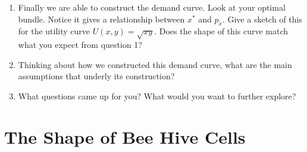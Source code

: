 \documentclass{amsbook}
\begin{document}
\begin{enumerate}
\begin{enumerate}
			\end{enumerate}
		\item Finally we are able to construct the demand curve. Look at your optimal bundle. Notice it gives a relationship between $x^*$ and $p_x$. Give a sketch of this for the utility curve $U(x,y)=\sqrt{xy}$. Does the shape of this curve match what you expect from question 1? 
		\item Thinking about how we constructed this demand curve, what are the main assumptions that underly its construction? 
		\item What questions came up for you? What would you want to further explore?
	\end{enumerate}

\newpage	    
    \section*{The Shape of Bee Hive Cells}
    
\end{document}
